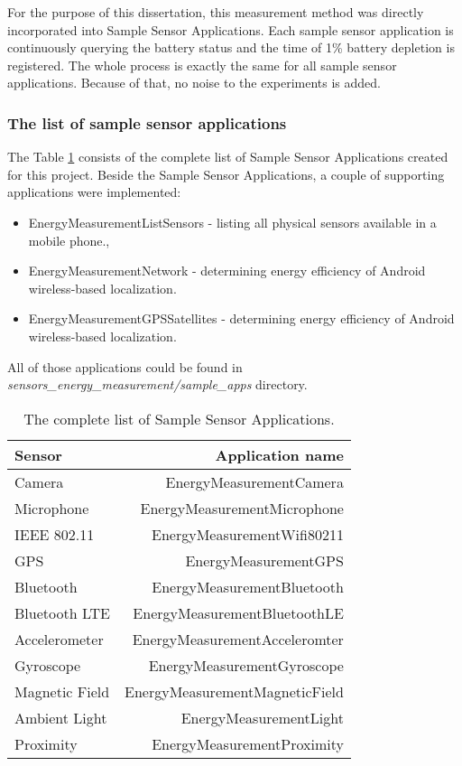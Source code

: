 For the purpose of this dissertation, this measurement method was directly incorporated into Sample Sensor Applications. Each sample sensor application is continuously querying the battery status and the time of 1\% battery depletion is registered. The whole process is exactly the same for all sample sensor applications. Because of that, no noise to the experiments is added.

\subsubsection{The list of sample sensor applications}	
\label{s:design:measurements:applications}
The Table \ref{table:samplesensorapps} consists of the complete list of Sample Sensor Applications created for this project. Beside the Sample Sensor Applications, a couple of supporting applications were implemented:
\begin{itemize}
	\item EnergyMeasurementListSensors - listing all physical sensors available in a mobile phone.,
	\item EnergyMeasurementNetwork - determining energy efficiency of Android wireless-based localization.
	\item EnergyMeasurementGPSSatellites - determining energy efficiency of Android wireless-based localization.	
\end{itemize}
All of those applications could be found in \textit{sensors\_energy\_measurement/sample\_apps} directory.
		
\begin{table}[H]
	\centering
    \begin{tabular}{| l | r | }
    \hline
    Sensor & Application name \\ \hline
    Camera & EnergyMeasurementCamera \\ \hline
    Microphone & EnergyMeasurementMicrophone \\\hline
    IEEE 802.11 & EnergyMeasurementWifi80211 \\ \hline
    GPS & EnergyMeasurementGPS \\ \hline
    Bluetooth & EnergyMeasurementBluetooth \\ \hline
    Bluetooth LTE & EnergyMeasurementBluetoothLE \\ \hline
    Accelerometer & EnergyMeasurementAcceleromter \\ \hline
    Gyroscope & EnergyMeasurementGyroscope \\ \hline
    Magnetic Field & EnergyMeasurementMagneticField\\ \hline
    Ambient Light & EnergyMeasurementLight \\ \hline
    Proximity & EnergyMeasurementProximity \\ \hline
    \end{tabular}
    \caption{The complete list of Sample Sensor Applications.}
	\label{table:samplesensorapps}
\end{table}			


